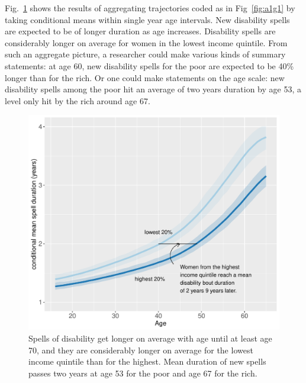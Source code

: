 \documentclass{article}
\begin{document}
Fig.~\ref{fig:a1m1} shows the results of aggregating trajectories coded as in Fig~\ref{fig:a1g1} by taking conditional means within single year age intervals. New disability spells are expected to be of longer duration as age increases. Disability spells are considerably longer on average for women in the lowest income quintile. From such an aggregate picture, a researcher could make various kinds of summary statements: at age 60, new disability spells for the poor are expected to be 40\% longer than for the rich. Or one could make statements on the age scale: new disability spells among the poor hit an average of two years duration by age 53, a level only hit by the rich around age 67.
\begin{figure}[ht!]
    \centering
    \includegraphics[scale=.6]{Figures/App1_macro1.pdf}
    \caption{Spells of disability get longer on average with age until at least age 70, and they are considerably longer on average for the lowest income quintile than for the highest. Mean duration of new spells passes two years at age 53 for the poor and age 67 for the rich.}
    \label{fig:a1m1}
\end{figure}
\end{document}
